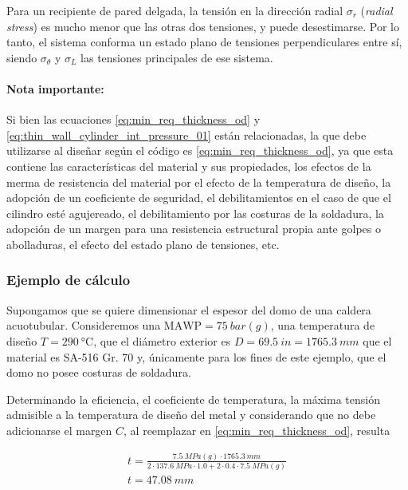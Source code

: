Para un recipiente de pared delgada, la tensión en la dirección radial $\sigma_{r}$ (\textit{radial stress}) es mucho menor que las otras dos tensiones, y puede desestimarse. Por lo tanto, el sistema conforma un estado plano de tensiones perpendiculares entre sí, siendo $\sigma_{\theta}$ y $\sigma_L$ las tensiones principales de ese sistema.

\paragraph{Nota importante:} Si bien las ecuaciones \ref{eq:min_req_thickness_od} y \ref{eq:thin_wall_cylinder_int_pressure_01} están relacionadas, la que debe utilizarse al diseñar según el código es \ref{eq:min_req_thickness_od}, ya que esta contiene las características del material y sus propiedades, los efectos de la merma de resistencia del material por el efecto de la temperatura de diseño, la adopción de un coeficiente de seguridad, el debilitamientos en el caso de que el cilindro esté agujereado, el debilitamiento por las costuras de la soldadura, la adopción de un margen para una resistencia estructural propia ante golpes o abolladuras, el efecto del estado plano de tensiones, etc. 

\subsubsection{Ejemplo de cálculo}

Supongamos que se quiere dimensionar el espesor del domo de una caldera acuotubular. Consideremos una $\text{MAWP}=\SI{75}{bar(g)}$, una temperatura de diseño $T=\SI{290}{\celsius}$, que el diámetro exterior es $D=\SI{69,5}{in}=\SI{1765.3}{mm}$ que el material es SA-516 Gr. \num{70} y, únicamente para los fines de este ejemplo, que el domo no posee costuras de soldadura.

Determinando la eficiencia, el coeficiente de temperatura, la máxima tensión admisible a la temperatura de diseño del metal y considerando que no debe adicionarse el margen $C$, al reemplazar en \ref{eq:min_req_thickness_od}, resulta

\begin{gather*}
     t=\frac{\SI{7,5}{MPa(g)}\cdot\SI{1765,3}{mm}}{2\cdot\SI{137,6}{MPa}\cdot \num{1,0}+\num{2}\cdot \num{0,4}\cdot \SI{7,5}{MPa(g)}}\\
     \boxed{t=\SI{47,08}{mm}}
\end{gather*}




